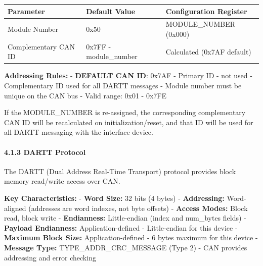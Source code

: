\documentclass[
  11pt,
]{article}
\newcounter{none} %
\begin{document}
{\def\LTcaptype{none} %
\begin{longtable}[]{@{}
  >{\raggedright\arraybackslash}p{}
  >{\raggedright\arraybackslash}p{}
  >{\raggedright\arraybackslash}p{}@{}}
\toprule\noalign{}
\begin{minipage}[b]{\linewidth}\raggedright
Parameter
\end{minipage} & \begin{minipage}[b]{\linewidth}\raggedright
Default Value
\end{minipage} & \begin{minipage}[b]{\linewidth}\raggedright
Configuration Register
\end{minipage} \\
\midrule\noalign{}
\endhead
\bottomrule\noalign{}
\endlastfoot
Module Number & 0x50 & MODULE\_NUMBER (0x000) \\
Complementary CAN ID & 0x7FF - module\_number & Calculated (0x7AF
default) \\
\end{longtable}
}

\textbf{Addressing Rules:} - \textbf{DEFAULT CAN ID}: 0x7AF - Primary ID
- not used - Complementary ID used for all DARTT messages - Module
number must be unique on the CAN bus - Valid range: 0x01 - 0x7FE

If the MODULE\_NUMBER is re-assigned, the corresponding complementary
CAN ID will be recalculated on initialization/reset, and that ID will be
used for all DARTT messaging with the interface device.

\paragraph{4.1.3 DARTT Protocol}\label{dartt-protocol}

The DARTT (Dual Address Real-Time Transport) protocol provides block
memory read/write access over CAN.

\textbf{Key Characteristics:} - \textbf{Word Size:} 32 bits (4 bytes) -
\textbf{Addressing:} Word-aligned (addresses are word indexes, not byte
offsets) - \textbf{Access Modes:} Block read, block write -
\textbf{Endianness:} Little-endian (index and num\_bytes fields) -
\textbf{Payload Endianness:} Application-defined - Little-endian for
this device - \textbf{Maximum Block Size:} Application-defined - 6 bytes
maximum for this device - \textbf{Message Type:}
TYPE\_ADDR\_CRC\_MESSAGE (Type 2) - CAN provides addressing and error
checking
\end{document}
